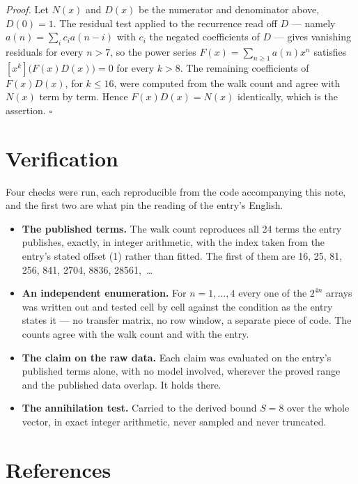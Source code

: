 \documentclass[11pt]{article}
\theoremstyle{definition}
\begin{document}
{\itshape Proof.} Let $N(x)$ and $D(x)$ be the numerator and denominator above, $D(0)=1$. The residual test applied to the recurrence read off $D$ --- namely $a(n) = \sum_i c_i a(n-i)$ with $c_i$ the negated coefficients of $D$ --- gives vanishing residuals for every $n > 7$, so the power series $F(x)=\sum_{n\ge 1}a(n)x^n$ satisfies $[x^k]\bigl(F(x)D(x)\bigr) = 0$ for every $k > 8$. The remaining coefficients of $F(x)D(x)$, for $k \le 16$, were computed from the walk count and agree with $N(x)$ term by term. Hence $F(x)D(x) = N(x)$ identically, which is the assertion. $\square$

\section{Verification}

Four checks were run, each reproducible from the code accompanying this note, and the first two are what pin the reading of the entry's English.

\begin{itemize}

\item {\bfseries The published terms.} The walk count reproduces all 24 terms the entry publishes, exactly, in integer arithmetic, with the index taken from the entry's stated offset (1) rather than fitted. The first of them are 16, 25, 81, 256, 841, 2704, 8836, 28561,~\dots

\item {\bfseries An independent enumeration.} For $n = 1,\dots,4$ every one of the $2^{4n}$ arrays was written out and tested cell by cell against the condition as the entry states it --- no transfer matrix, no row window, a separate piece of code. The counts agree with the walk count and with the entry.

\item {\bfseries The claim on the raw data.} Each claim was evaluated on the entry's published terms alone, with no model involved, wherever the proved range and the published data overlap. It holds there.

\item {\bfseries The annihilation test.} Carried to the derived bound $S = 8$ over the whole vector, in exact integer arithmetic, never sampled and never truncated.

\end{itemize}

\section{References}
\end{document}
